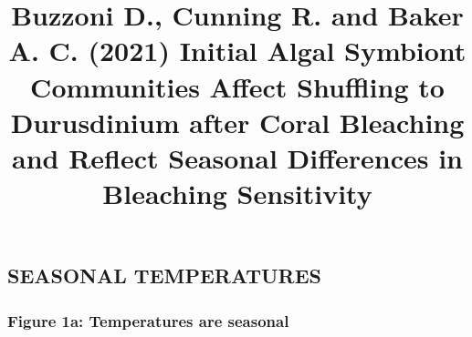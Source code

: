 \documentclass[]{article}
\title{Buzzoni D., Cunning R. and Baker A. C. (2021) Initial Algal Symbiont
Communities Affect Shuffling to Durusdinium after Coral Bleaching and
Reflect Seasonal Differences in Bleaching Sensitivity}
\author{}
\date{\vspace{-2.5em}}
\begin{document}
\maketitle

\hypertarget{seasonal-temperatures}{%
\subsection{SEASONAL TEMPERATURES}\label{seasonal-temperatures}}

\hypertarget{figure-1a-temperatures-are-seasonal}{%
\subsubsection{Figure 1a: Temperatures are
seasonal}\label{figure-1a-temperatures-are-seasonal}}
\end{document}
